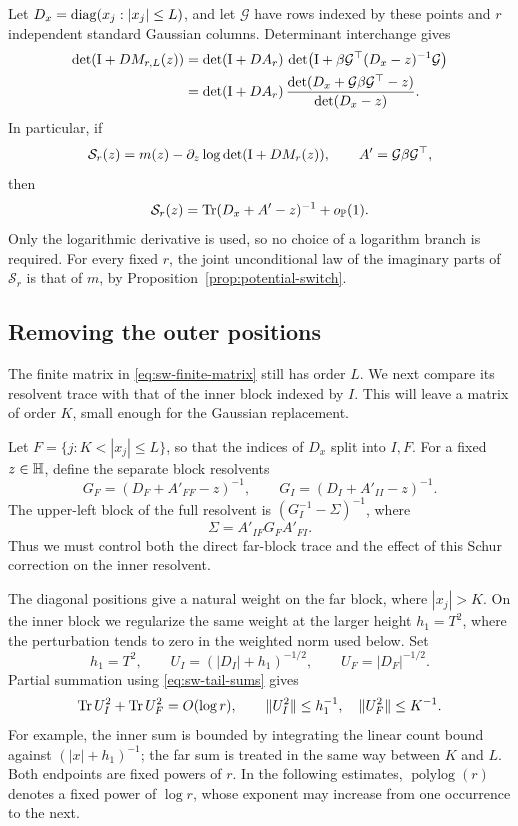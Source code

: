 Let \(D_x=\operatorname{diag}(x_j:|x_j|\le L)\), and let \(\mathcal G\) have rows
indexed by these points and \(r\) independent standard Gaussian columns.
Determinant interchange gives
\begin{align*}
 \det(\mathrm I+DM_{r,L}(z))
 &=\det(\mathrm I+DA_r)\,
   \det\bigl(\mathrm I+\beta\mathcal G^\top(D_x-z)^{-1}\mathcal G\bigr)\\
 &=\det(\mathrm I+DA_r)\,
   \frac{\det(D_x+\mathcal G\beta\mathcal G^\top-z)}{\det(D_x-z)}.
\end{align*}
In particular, if
\[
 \mathcal S_r(z)=m(z)-\partial_z\log\det(\mathrm I+DM_r(z)),
 \qquad A'=\mathcal G\beta\mathcal G^\top,
\]
then
\begin{equation}\label{eq:sw-finite-matrix}
 \mathcal S_r(z)=\operatorname{Tr}(D_x+A'-z)^{-1}+o_{\mathbb P}(1).
\end{equation}
Only the logarithmic derivative is used, so no choice of a logarithm
branch is required. For every fixed \(r\), the joint unconditional law
of the imaginary parts of \(\mathcal S_r\) is that of \(m\), by
Proposition~\ref{prop:potential-switch}.

\subsection{Removing the outer positions}

The finite matrix in \eqref{eq:sw-finite-matrix} still has order \(L\).
We next compare its resolvent trace with that of the inner block indexed
by \(I\). This will leave a matrix of order \(K\), small enough for the
Gaussian replacement.

Let \(F=\{j:K<|x_j|\le L\}\), so that the indices of \(D_x\) split into \(I,F\).
For a fixed \(z\in\mathbb H\), define the separate block resolvents
\[
 G_F=(D_F+A'_{FF}-z)^{-1},\qquad
 G_I=(D_I+A'_{II}-z)^{-1}.
\]
The upper-left block of the full resolvent is
\((G_I^{-1}-\Sigma)^{-1}\), where
\[
 \Sigma=A'_{IF}G_FA'_{FI}.
\]
Thus we must control both the direct far-block trace and the effect of
this Schur correction on the inner resolvent.

The diagonal positions give a natural weight on the far block, where
\(|x_j|>K\). On the inner block we regularize the same weight at the
larger height \(h_1=T^2\), where the perturbation tends to zero in the
weighted norm used below. Set
\begin{equation}\label{eq:sw-weights}
 h_1=T^2,\qquad U_I=(|D_I|+h_1)^{-1/2},\qquad
 U_F=|D_F|^{-1/2}.
\end{equation}
Partial summation using \eqref{eq:sw-tail-sums} gives
\begin{equation}\label{eq:sw-weight-bounds}
 \operatorname{Tr} U_I^2+\operatorname{Tr} U_F^2=O(\log r),\qquad
 \|U_I^2\|\le h_1^{-1},\quad \|U_F^2\|\le K^{-1}.
\end{equation}
For example, the inner sum is bounded by integrating the linear count
bound against \((|x|+h_1)^{-1}\); the far sum is treated in the same way
between \(K\) and \(L\). Both endpoints are fixed powers of \(r\).
In the following estimates, \(\operatorname{polylog}(r)\) denotes a fixed
power of \(\log r\), whose exponent may increase from one occurrence
to the next.

